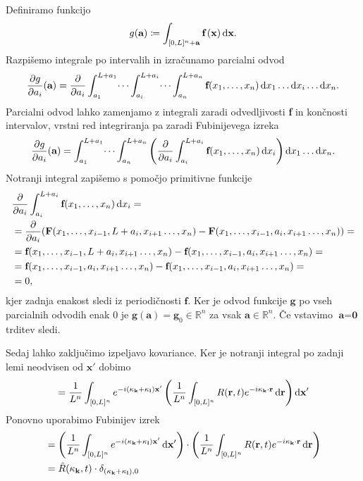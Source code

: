 \documentclass[mat2, tisk]{fmfdelo}
\newcommand{\R}{\mathbb R}
\newcommand{\bd}{\textbf}
\begin{document}
\begin{dokaz}
Definiramo funkcijo 
$$
g(\bd{a}) \coloneqq \int_{[0, L]^n + \bd{a}}\bd{f}\,(\bd{x}) \dif\bd{x}.
$$
Razpišemo integrale po intervalih in izračunamo parcialni odvod
\begin{align*}
\frac{\partial g}{\partial a_i}(\bd{a}) = \frac{\partial}{\partial a_i} \int_{a_1}^{L + a_1} \dots \int_{a_i}^{L + a_i} \dots \int_{a_n}^{L + a_n} \bd{f}(x_1, \dots, x_n) \dif x_1 \dots \dif x_i \dots  \dif x_n.
\end{align*}
Parcialni odvod lahko zamenjamo z integrali zaradi odvedljivosti \bd{f} in končnosti 
intervalov, vrstni red integriranja pa zaradi Fubinijevega izreka 
\begin{align*}
  \frac{\partial g}{\partial a_i}(\bd{a}) = \int_{a_1}^{L + a_1} \dots \int_{a_n}^{L + a_n} \left(\frac{\partial}{\partial a_i} \int_{a_i}^{L + a_i} \bd{f}(x_1, \dots, x_n) \dif x_i \right) \dif x_1 \dots \dif x_n.
\end{align*}
Notranji integral zapišemo s pomočjo primitivne funkcije 
\begin{align*}
&\frac{\partial}{\partial a_i} \int_{a_i}^{L + a_i} \bd{f}(x_1, \dots, x_n) \dif x_i = \\
&= \frac{\partial}{\partial a_i} (\bd{F}(x_1, \dots, x_{i-1}, L + a_i, x_{i+1} \dots, x_n) - \bd{F}(x_1, \dots, x_{i-1},  a_i, x_{i+1} \dots, x_n)) = \\
&= \bd{f}(x_1, \dots, x_{i-1}, L + a_i, x_{i+1} \dots, x_n) - \bd{f}(x_1, \dots, x_{i-1},  a_i, x_{i+1} \dots, x_n) = \\
&= \bd{f}(x_1, \dots, x_{i-1}, a_i, x_{i+1} \dots, x_n) - \bd{f}(x_1, \dots, x_{i-1},  a_i, x_{i+1} \dots, x_n) = \\
&= 0,
\end{align*}
kjer zadnja enakost sledi iz periodičnosti $\bd{f}$. Ker je odvod funkcije 
$\bd{g}$ po vseh parcialnih odvodih enak $0$ je $\bd{g}(\bd{a}) = \bd{g}_0 \in \R^n$  
za vsak $\bd{a} \in \R^n$. Če vstavimo $\bd{a} = \bd{0}$ trditev sledi.
\end{dokaz}
Sedaj lahko zaključimo izpeljavo kovariance. Ker je notranji integral po zadnji lemi neodvisen 
od $\bd{x}'$ dobimo 
$$
= \frac{1}{L^{n}} \int_{[0, L]^{n}} e^{-i(\bd{\text{$\kappa$}}_{\bd{k}} + \bd{\text{$\kappa$}}_{\bd{l}})\bd{x}'}\left(\frac{1}{L^n}\int_{[0, L]^{n}} R(\bd{r}, t) e^{-i\bd{\text{$\kappa$}}_{\bd{k}} \cdot \bd{r}} \dif\bd{r}\right) \dif\bd{x}'
$$
Ponovno uporabimo Fubinijev izrek 
\begin{align*}
&= \left(\frac{1}{L^{n}} \int_{[0, L]^{n}} e^{-i(\bd{\text{$\kappa$}}_{\bd{k}} + \bd{\text{$\kappa$}}_{\bd{l}})\bd{x}'} \dif\bd{x}' \right) \cdot\left(\frac{1}{L^n}\int_{[0, L]^{n}} R(\bd{r}, t) e^{-i\bd{\text{$\kappa$}}_{\bd{k}} \cdot \bd{r}} \dif\bd{r}\right) \\
&= \hat{R}(\text{\bd{$\kappa$}}_{\bd{k}}, t) \cdot \delta_{(\bd{\text{$\kappa$}}_{\bd{k}} + \bd{\text{$\kappa$}}_{\bd{l}}), 0}
\end{align*}
\end{document}
